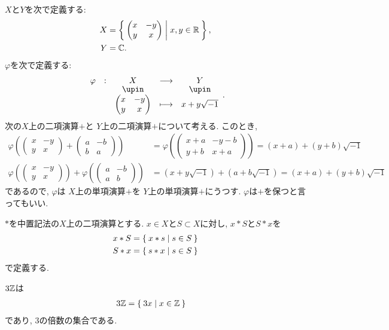 \begin{example}
  $X$と$Y$を次で定義する:
  \begin{align*}
    X&=\Set{\begin{pmatrix}x&-y\\y&x\end{pmatrix}|x,y\in\mathbb{R}},\\
    Y&=\mathbb{C}.
  \end{align*}
  $\varphi$を次で定義する:
  \begin{align*}
    \shazo{\varphi}{X}{Y}
    {\begin{pmatrix}x&-y\\y&x\end{pmatrix}}{x+y\sqrt{-1}}.
  \end{align*}
  次の$X$上の二項演算$+$と
  $Y$上の二項演算$+$について考える.
  このとき,
  \begin{align*}
    \varphi(\begin{pmatrix}x&-y\\y&x\end{pmatrix}+\begin{pmatrix}a&-b\\b&a\end{pmatrix})&=\varphi(\begin{pmatrix}x+a&-y-b\\y+b&x+a\end{pmatrix})=(x+a)+(y+b)\sqrt{-1}\\
    \varphi(\begin{pmatrix}x&-y\\y&x\end{pmatrix})+\varphi(\begin{pmatrix}a&-b\\a&b\end{pmatrix})&=(x+y\sqrt{-1})+(a+b\sqrt{-1})=(x+a)+(y+b)\sqrt{-1}
  \end{align*}
  であるので,
  $\varphi$は
  $X$上の単項演算$+$を
  $Y$上の単項演算$+$にうつす.
  $\varphi$は$+$を保つと言ってもいい.
\end{example}

\begin{definition}
  $\ast$を中置記法の$X$上の二項演算とする.
  $x\in X$と$S\subset X$に対し,
  $x\ast S$と$S\ast x$を
  \begin{align*}
    x\ast S &=\Set{x\ast s|s\in S}\\
    S\ast x &=\Set{s\ast x|s\in S}
  \end{align*}
  で定義する.
\end{definition}
\begin{example}
  $3\mathbb{Z}$は
  \begin{align*}
    3\mathbb{Z}&=\Set{3x|x\in\mathbb{Z}}
  \end{align*}
  であり, $3$の倍数の集合である.
\end{example}


